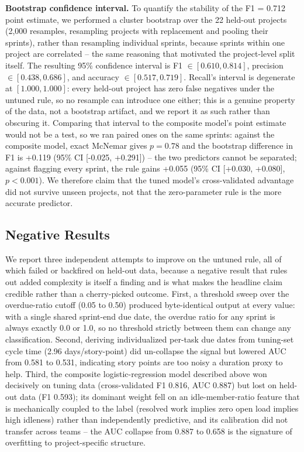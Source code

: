 \documentclass[conference]{IEEEtran}
\begin{document}
\textbf{Bootstrap confidence interval.} To quantify the stability of the F1 = 0.712
point estimate, we performed a cluster bootstrap over the 22 held-out projects (2{,}000
resamples, resampling projects with replacement and pooling their sprints), rather
than resampling individual sprints, because sprints within one project are
correlated -- the same reasoning that motivated the project-level split itself. The
resulting 95\% confidence interval is F1 $\in [0.610, 0.814]$, precision $\in [0.438,
0.686]$, and accuracy $\in [0.517, 0.719]$. Recall's interval is degenerate at
$[1.000, 1.000]$: every held-out project has zero false negatives under the untuned
rule, so no resample can introduce one either; this is a genuine property of the
data, not a bootstrap artifact, and we report it as such rather than obscuring it.
Comparing that interval to the composite model's point estimate would not be a test,
so we ran paired ones on the same sprints: against the composite model, exact McNemar
gives $p = 0.78$ and the bootstrap difference in F1 is +0.119 (95\% CI [-0.025,
+0.291]) -- the two predictors cannot be separated; against flagging every sprint, the
rule gains +0.055 (95\% CI [+0.030, +0.080], $p < 0.001$). We therefore claim that the
tuned model's cross-validated advantage did not survive unseen projects, not that the
zero-parameter rule is the more accurate predictor.

\subsection{Negative Results}

We report three independent attempts to improve on the untuned rule, all of which
failed or backfired on held-out data, because a negative result that rules out added
complexity is itself a finding and is what makes the headline claim credible rather
than a cherry-picked outcome. First, a threshold sweep over the overdue-ratio cutoff
(0.05 to 0.50) produced byte-identical output at every value: with a single
shared sprint-end due date, the overdue ratio for any sprint is always exactly 0.0 or
1.0, so no threshold strictly between them can change any classification. Second,
deriving individualized per-task due dates from tuning-set cycle time (2.96
days/story-point) did un-collapse the signal but lowered AUC from 0.581 to 0.531,
indicating story points are too noisy a duration proxy to help. Third, the composite
logistic-regression model described above won decisively on tuning data
(cross-validated F1 0.816, AUC 0.887) but lost on held-out data (F1 0.593); its
dominant weight fell on an idle-member-ratio feature that is mechanically coupled to
the label (resolved work implies zero open load implies high idleness) rather than
independently predictive, and its calibration did not transfer across teams -- the
AUC collapse from 0.887 to 0.658 is the signature of overfitting to project-specific
structure.
\end{document}
